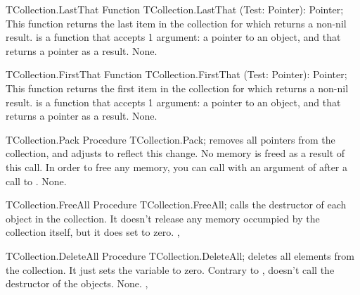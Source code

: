 \begin{function}{TCollection.LastThat}
\Declaration
Function TCollection.LastThat (Test: Pointer): Pointer;
\Description
This function returns the last item in the collection for which 
returns a non-nil result.  is a function that accepts 1 argument:
a pointer to an object, and that returns a pointer as a result.
\Errors
None.
\SeeAlso
{}
\end{function}


\begin{function}{TCollection.FirstThat}
\Declaration
Function TCollection.FirstThat (Test: Pointer): Pointer;
\Description
This function returns the first item in the collection for which 
returns a non-nil result.  is a function that accepts 1 argument:
a pointer to an object, and that returns a pointer as a result.
\Errors
None.
\SeeAlso
{}
\end{function}


\begin{procedure}{TCollection.Pack}
\Declaration
Procedure TCollection.Pack;
\Description
{} removes all  pointers from the collection, and adjusts
 to reflect this change. No memory is freed as a result of this
call. In order to free any memory, you can call  with an
argument of  after a call to .
\Errors
None.
\SeeAlso
{}
\end{procedure}


\begin{procedure}{TCollection.FreeAll}
\Declaration
Procedure TCollection.FreeAll;
\Description
{} calls the destructor of each object in the collection.
It doesn't release any memory occumpied by the collection itself, but it
does set  to zero.
\Errors
\SeeAlso
{}, 
\end{procedure}


\begin{procedure}{TCollection.DeleteAll}
\Declaration
Procedure TCollection.DeleteAll;
\Description
{} deletes all elements from the collection. It just sets 
the  variable to zero. Contrary to
,  doesn't call the
destructor of the objects.
\Errors
None.
\SeeAlso
{}, 
\end{procedure}



